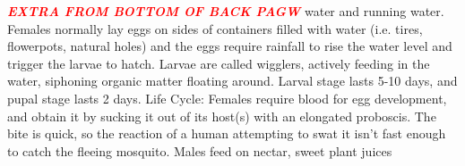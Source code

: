 \documentclass{article}
\newcommand{\red}[1]{\textcolor{red}{#1}}
\newcommand{\mysection}[1]{\textbf{\textit{\red{#1}}}}
\begin{document}
\begin{multicols*}{4}
        \mysection{EXTRA FROM BOTTOM OF BACK PAGW}
        water and running water. Females normally lay eggs on sides of containers filled with water (i.e. tires, flowerpots, natural holes) and the eggs require rainfall to rise the water level and trigger the larvae to hatch. Larvae are called wigglers, actively feeding in the water, siphoning organic matter floating around. Larval stage lasts 5-10 days, and pupal stage lasts 2 days. Life Cycle: Females require blood for egg development, and obtain it by sucking it out of its host(s) with an elongated proboscis. The bite is quick, so the reaction of a human attempting to swat it isn't fast enough to catch the fleeing mosquito. Males feed on nectar, sweet plant juices

\end{multicols*}
\end{document}
